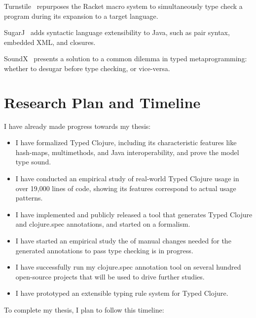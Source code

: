 \documentclass[9pt]{extarticle}
\begin{document}
Turnstile~\cite{Chang2017TSM} repurposes the Racket macro system
to simultaneously type check a program during its expansion to
a target language.

SugarJ~\cite{Erdweg2011SJ}
adds syntactic language extensibility to Java, such as pair
syntax, embedded XML, and closures.

SoundX~\cite{Lorenzen2016STS} presents a solution to a common
dilemma in typed metaprogramming: whether to desugar before
type checking, or vice-versa.


\section{Research Plan and Timeline}

I have already made progress towards my thesis:

\begin{itemize}
  \item I have formalized Typed Clojure, including
    its characteristic features like hash-maps, multimethods, and Java interoperability,
    and prove the model type sound.
  \item I have conducted an empirical study of real-world Typed Clojure usage
    in over 19,000 lines of code, showing its features correspond to actual usage patterns.
  \item I have implemented and publicly released a tool that generates
    Typed Clojure and clojure.spec annotations, and started on a formalism.
  \item I have started an empirical study the of manual changes needed for the generated annotations
    to pass type checking is in progress.
  \item I have successfully run my clojure.spec annotation tool on several hundred open-source projects that
    will be used to drive further studies.
  \item I have prototyped an extensible typing rule system for Typed Clojure.
\end{itemize}

To complete my thesis, I plan to follow this timeline:
\end{document}
